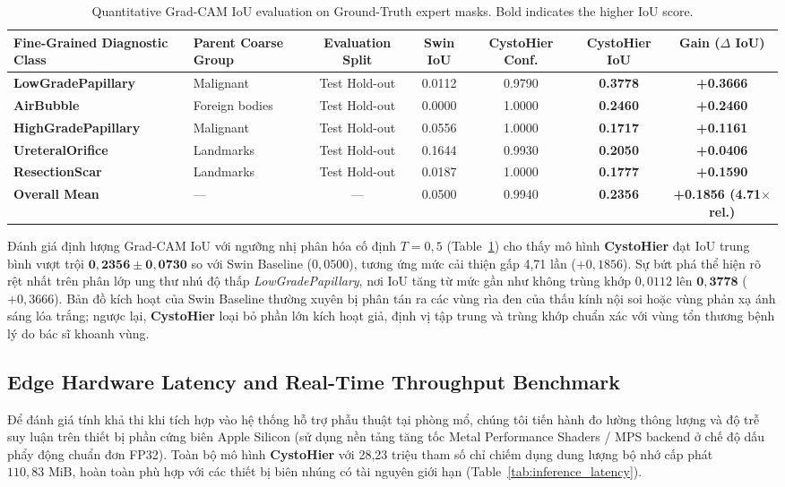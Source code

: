 \documentclass[runningheads]{llncs}
\begin{document}
\begin{table}[H]
\centering
\caption{Quantitative Grad-CAM IoU evaluation on Ground-Truth expert masks. Bold indicates the higher IoU score.}
\label{tab:gradcam_iou}
\begin{adjustbox}{max width=\textwidth}
\begin{tabular}{llccccc}
\toprule
\textbf{Fine-Grained Diagnostic Class} & \textbf{Parent Coarse Group} & \textbf{Evaluation Split} & \textbf{Swin IoU} & \textbf{CystoHier Conf.} & \textbf{CystoHier IoU} & \textbf{Gain ($\Delta$ IoU)} \\
\midrule
\textbf{LowGradePapillary} & Malignant & Test Hold-out & 0.0112 & 0.9790 & \textbf{0.3778} & \textbf{+0.3666} \\
\textbf{AirBubble} & Foreign bodies & Test Hold-out & 0.0000 & 1.0000 & \textbf{0.2460} & \textbf{+0.2460} \\
\textbf{HighGradePapillary} & Malignant & Test Hold-out & 0.0556 & 1.0000 & \textbf{0.1717} & \textbf{+0.1161} \\
\textbf{UreteralOrifice} & Landmarks & Test Hold-out & 0.1644 & 0.9930 & \textbf{0.2050} & \textbf{+0.0406} \\
\textbf{ResectionScar} & Landmarks & Test Hold-out & 0.0187 & 1.0000 & \textbf{0.1777} & \textbf{+0.1590} \\
\midrule
\textbf{Overall Mean} & --- & --- & 0.0500 & 0.9940 & \textbf{0.2356} & \textbf{+0.1856 (4.71$\times$ rel.)} \\
\bottomrule
\end{tabular}
\end{adjustbox}
\end{table}

Đánh giá định lượng Grad-CAM IoU với ngưỡng nhị phân hóa cố định $T=0{,}5$ (Table~\ref{tab:gradcam_iou}) cho thấy mô hình \textbf{CystoHier} đạt IoU trung bình vượt trội $\mathbf{0{,}2356 \pm 0{,}0730}$ so với Swin Baseline ($0{,}0500$), tương ứng mức cải thiện gấp 4,71 lần ($+0{,}1856$). Sự bứt phá thể hiện rõ rệt nhất trên phân lớp ung thư nhú độ thấp \textit{LowGradePapillary}, nơi IoU tăng từ mức gần như không trùng khớp $0{,}0112$ lên $\mathbf{0{,}3778}$ ($+0{,}3666$). Bản đồ kích hoạt của Swin Baseline thường xuyên bị phân tán ra các vùng rìa đen của thấu kính nội soi hoặc vùng phản xạ ánh sáng lóa trắng; ngược lại, \textbf{CystoHier} loại bỏ phần lớn kích hoạt giả, định vị tập trung và trùng khớp chuẩn xác với vùng tổn thương bệnh lý do bác sĩ khoanh vùng.

\subsection{Edge Hardware Latency and Real-Time Throughput Benchmark}
Để đánh giá tính khả thi khi tích hợp vào hệ thống hỗ trợ phẫu thuật tại phòng mổ, chúng tôi tiến hành đo lường thông lượng và độ trễ suy luận trên thiết bị phần cứng biên Apple Silicon (sử dụng nền tảng tăng tốc Metal Performance Shaders / MPS backend ở chế độ dấu phẩy động chuẩn đơn FP32). Toàn bộ mô hình \textbf{CystoHier} với 28,23 triệu tham số chỉ chiếm dụng dung lượng bộ nhớ cấp phát $110{,}83\text{ MiB}$, hoàn toàn phù hợp với các thiết bị biên nhúng có tài nguyên giới hạn (Table~\ref{tab:inference_latency}).
\end{document}

